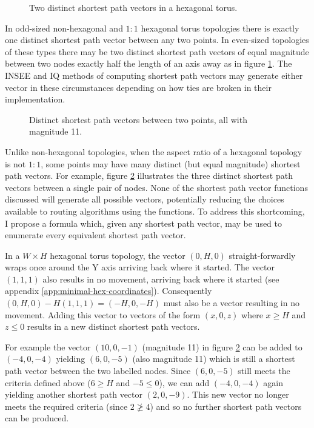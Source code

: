 			\begin{figure}
				\center
				
				\caption{Two distinct shortest path vectors in a hexagonal torus.}
				\label{fig:wrap-alternatives}
			\end{figure}
			
			In odd-sized non-hexagonal and $1:1$ hexagonal torus topologies there is
			exactly one distinct shortest path vector between any two points. In
			even-sized topologies of these types there may be two distinct shortest
			path vectors of equal magnitude between two nodes exactly half the length
			of an axis away as in figure \ref{fig:wrap-alternatives}. The INSEE and
			IQ methods of computing shortest path vectors may generate either vector
			in these circumstances depending on how ties are broken in their
			implementation.
			
			\begin{figure}
				\center
				
				\caption{Distinct shortest path vectors between two points, all with
				magnitude 11.}
				\label{fig:spiralling}
			\end{figure}
			
			Unlike non-hexagonal topologies, when the aspect ratio of a hexagonal
			topology is not $1:1$, some points may have many distinct (but equal
			magnitude) shortest path vectors.  For example, figure
			\ref{fig:spiralling} illustrates the three distinct shortest path vectors
			between a single pair of nodes. None of the shortest path vector
			functions discussed will generate all possible vectors, potentially
			reducing the choices available to routing algorithms using the functions.
			To address this shortcoming, I propose a formula which, given any
			shortest path vector, may be used to enumerate every equivalent shortest
			path vector.
			
			In a $W \times H$ hexagonal torus topology, the vector $(0, H, 0)$
			straight-forwardly wraps once around the Y axis arriving back where it
			started. The vector $(1,1,1)$ also results in no movement, arriving back
			where it started (see appendix \ref{app:minimal-hex-coordinates}).
			Consequently $(0,H,0) - H(1,1,1) = (-H, 0, -H)$ must also be a vector
			resulting in no movement.  Adding this vector to vectors of the form $(x,
			0, z)$ where $x\ge H$ and $z\le0$ results in a new distinct shortest path
			vectors.
			
			For example the vector $(10, 0, -1)$ (magnitude 11) in figure
			\ref{fig:spiralling} can be added to $(-4, 0, -4)$ yielding $(6, 0, -5)$
			(also magnitude 11) which is still a shortest path vector between the two
			labelled nodes.  Since $(6, 0, -5)$ still meets the criteria defined
			above ($6 \ge H$ and $-5 \le 0$), we can add $(-4, 0, -4)$ again yielding
			another shortest path vector $(2, 0, -9)$.  This new vector no longer
			meets the required criteria (since $2 \ngeq 4$) and so no further
			shortest path vectors can be produced.
			
